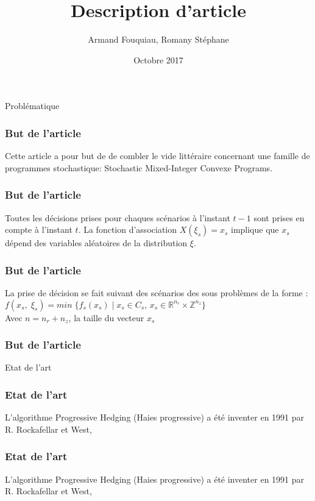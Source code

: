 \documentclass[10pt]{beamer}
\title{Description d'article}
\author{Armand Fouquiau, Romany Stéphane}
\institute{Université Paris-Sud}
\date{Octobre 2017}
\newcommand{\reels}{\mathbb{R}}
\newcommand{\integers}{\mathbb{Z}}
\begin{document}
    \begin{frame}
    \titlepage
    \end{frame}

    \begin{section}{Problématique}
        \begin{frame}
        \frametitle{But de l'article}
        Cette article a pour but de de combler le vide littéraire concernant une famille de programmes stochastique: Stochastic Mixed-Integer Convexe Programs.
    \end{frame}
        
    \begin{frame}
        \frametitle{But de l'article}
        Toutes les décisions prises pour chaques scénarios à l'instant $t-1$ sont prises en compte à l'instant $t$. La fonction d'association $X(\xi_s) = x_s$ implique que $x_s$ dépend des variables aléatoires de la distribution $\xi$.
    \end{frame}
    
    
    \begin{frame}
        \frametitle{But de l'article}
        La prise de décision se fait suivant des scénarios des sous problèmes de la forme : 
         $f(x_s, \;\xi_{s}) = min \;\{f_s(x_s) \; | \; x_s \in C_s, \,x_s \in \reels^{n_r} \times \integers^{n_z}\}$\\
         Avec $n = n_r + n_z$, la taille du vecteur $x_s$
    \end{frame}    
    
    \begin{frame}
        \frametitle{But de l'article}               
    \end{frame}
    \end{section}
    
    \begin{section}{Etat de l'art}
    \begin{frame}
        \frametitle{Etat de l'art}
        L'algorithme Progressive Hedging (Haies progressive) a été inventer en 1991 par R. Rockafellar et West, 
    \end{frame}
    
    \begin{frame}
        \frametitle{Etat de l'art}
        L'algorithme Progressive Hedging (Haies progressive) a été inventer en 1991 par R. Rockafellar et West, 
    \end{frame}
    \end{section}
        
\end{document}
